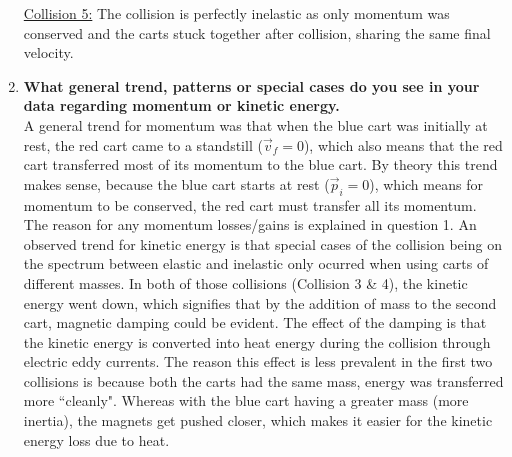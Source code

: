 \documentclass[12pt,letterpaper]{article}
\begin{document}
\begin{enumerate}
	      \underline{Collision 5:} The collision is perfectly inelastic as only momentum was conserved and the carts stuck together after collision, sharing the same final velocity.
	\item \textbf{What general trend, patterns or special cases do you see in your data regarding momentum or kinetic energy.}\\
	      A general trend for momentum was that when the blue cart was initially at rest, the red cart came to a standstill ($\vec{v}_{f} = 0$), which also means that the red cart transferred most of its momentum to the blue cart.
	      By theory this trend makes sense, because the blue cart starts at rest ($\vec{p}_{i} = 0$), which means for momentum to be conserved, the red cart must transfer all its momentum.
	      The reason for any momentum losses/gains is explained in question 1.
	      An observed trend for kinetic energy is that special cases of the collision being on the spectrum between elastic and inelastic only ocurred when using carts of different masses.
	      In both of those collisions (Collision 3 \& 4), the kinetic energy went down, which signifies that by the addition of mass to the second cart, magnetic damping could be evident.
	      The effect of the damping is that the kinetic energy is converted into heat energy during the collision through electric eddy currents.
	      The reason this effect is less prevalent in the first two collisions is because both the carts had the same mass, energy was transferred more ``cleanly".
	      Whereas with the blue cart having a greater mass (more inertia), the magnets get pushed closer, which makes it easier for the kinetic energy loss due to heat.
\end{enumerate}
\end{document}
